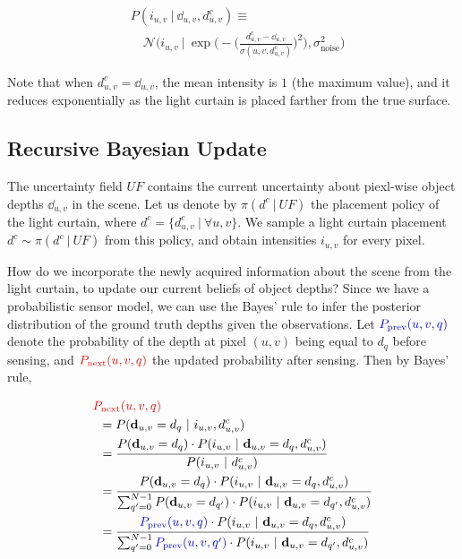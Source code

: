 \begin{align}
   &\nonumber P(i_{u, v}\ |\ \dd_{u, v}, d^c_{u, v}) \equiv\\
   &\quad \mathcal{N} \Big(i_{u, v}\ |\ \exp \Big(-\Bigg(\frac{d^c_{u, v} - \dd_{u, v}}{\sigma(u, v, d^c_{u, v})}\Bigg)^2\Big), \sigma_\text{noise}^2\Big)
   \label{eqn:sensor_model}
\end{align}

Note that when $d^c_{u, v} = \dd_{u, v}$, the mean intensity is $1$ (the maximum value), and it reduces exponentially as the light curtain is placed farther from the true surface.

\subsection{Recursive Bayesian Update}
\newcommand{\qb}{q'}
\newcommand{\before}[1]{{\color{blue} P_\text{prev}(u, v, #1)}}
\newcommand{\after}[1]{{\color{red} P_\text{next}(u, v, #1)}}

The uncertainty field $UF$ contains the current uncertainty about piexl-wise object depths $\dd_{u, v}$ in the scene. Let us denote by $\pi(d^c\ |\ UF)$ the placement policy of the light curtain, where $d^c = \{d^c_{u, v}\ |\ \forall u, v\}$. We sample a light curtain placement $d^c \sim \pi(d^c\ |\ UF)$ from this policy, and obtain intensities $i_{u, v}$ for every pixel.

How do we incorporate the newly acquired information about the scene from the light curtain, to update our current beliefs of object depths? Since we have a probabilistic sensor model, we can use the Bayes' rule to infer the posterior distribution of the ground truth depths given the observations. Let $\before{q}$ denote the probability of the depth at pixel $(u, v)$ being equal to $d_q$ before sensing, and $\after{q}$ the updated probability after sensing. Then by Bayes' rule,

\begin{align*}
   &\after{q} \\
   &\hspace{5pt}= P(\dd_{u, v} = d_q\ |\ i_{u, v}, d^c_{u, v}) \\
   &\hspace{5pt}= \frac{P(\dd_{u, v} = d_q) \cdot P(i_{u, v}\ |\ \dd_{u, v} = d_q, d^c_{u, v})}{P(i_{u, v}\ |\ d^c_{u, v})}\\
   &\hspace{5pt}= \frac{P(\dd_{u, v} = d_q) \cdot P(i_{u, v}\ |\ \dd_{u, v} = d_q, d^c_{u, v})}{\sum_{\qb=0}^{N-1} P(\dd_{u, v} = d_{\qb}) \cdot P(i_{u, v}\ |\ \dd_{u, v} = d_{\qb}, d^c_{u, v})}\\
   &\hspace{5pt}= \frac{\before{q} \cdot P(i_{u, v}\ |\ \dd_{u, v} = d_q, d^c_{u, v})}{\sum_{\qb=0}^{N-1} \before{\qb} \cdot P(i_{u, v}\ |\ \dd_{u, v} = d_{\qb}, d^c_{u, v})}
\end{align*}

